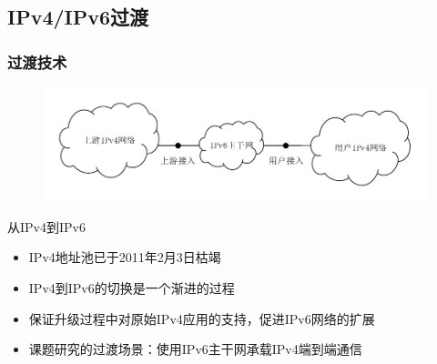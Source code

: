 \documentclass{beamer}
\begin{document}
\subsection{IPv4/IPv6过渡}
\begin{frame}
  \frametitle{过渡技术}
  \vspace{-1em}
  \begin{figure}
    \includegraphics[width=\textwidth]{figs/1-464.pdf}
  \end{figure}
  \vspace{-2em}

  \begin{block}{从IPv4到IPv6}
    \begin{itemize}
    \item IPv4地址池已于2011年2月3日枯竭\footnotemark[1]
    \item IPv4到IPv6的切换是一个渐进的过程
    \item 保证升级过程中对原始IPv4应用的支持，促进IPv6网络的扩展
    \item 课题研究的过渡场景：使用IPv6主干网承载IPv4端到端通信
    \end{itemize}
  \end{block}

\end{frame}
\end{document}
